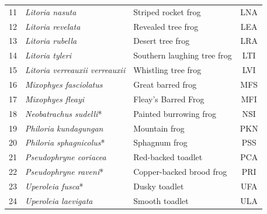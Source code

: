 \begin{table}[htb!]
{\begin{tabular}{cllc}
11                                 & \textit{Litoria nasuta}               & Striped rocket frog                                             & LNA                                \\ 
12                                 & \textit{Litoria revelata}             & Revealed tree frog                                             & LEA                                \\ 
13                                 & \textit{Litoria rubella}              & Desert tree frog                                                 & LRA                                \\ 
14                                 & \textit{Litoria tyleri}               & Southern laughing tree frog                                     & LTI                                \\ 
15                                 & \textit{Litoria verreauxii verreauxii}           & Whistling tree frog                                           & LVI                                \\ 
16                                 & \textit{Mixophyes fasciolatus}        & Great barred frog                                               & MFS                                \\ 
17                                 & \textit{Mixophyes fleayi}             & Fleay's Barred Frog                                             & MFI                                \\ 
18                                 & \textit{Neobatrachus sudelli}*        & Painted burrowing frog                                           & NSI                                \\ 
19                                 & \textit{Philoria kundagungan}         & Mountain frog                                                     & PKN                                \\ 
20                                 & \textit{Philoria sphagnicolus}*        & Sphagnum frog                                                    & PSS                                \\ 
21                                 & \textit{Pseudophryne coriacea}        & Red-backed toadlet                                            & PCA                                \\ 
22                                 & \textit{Pseudophryne raveni}*          & Copper-backed brood frog                                        & PRI                                \\ 
23                                 & \textit{Uperoleia fusca}*             & Dusky toadlet                                                   & UFA                                \\ 
24                                 & \textit{Uperoleia laevigata}          & Smooth toadlet                                                 & ULA                                \\ \hline\hline
\end{tabular}
}
\label{tab:Ch4_frogName}
\end{table}



